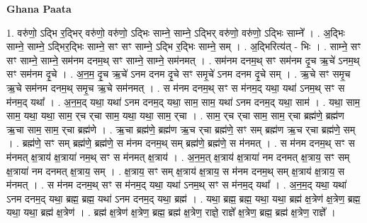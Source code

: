 \documentclass[17pt]{extarticle}
\begin{document}
\textbf{Ghana Paata } \newline

1. वरु॑णो॒ ऽद्भि र॒द्भिर् वरु॑णो॒ वरु॑णो॒ ऽद्भिः साम्ने॒ साम्ने॒ ऽद्भिर् वरु॑णो॒ वरु॑णो॒ ऽद्भिः साम्ने᳚ । . अ॒द्भिः साम्ने॒ साम्ने॒ ऽद्भिर॒द्भिः साम्ने॒ सꣳ सꣳ साम्ने॒ ऽद्भि र॒द्भिः साम्ने॒ सम् । . अ॒द्भिरित्य॑त् - भिः । . साम्ने॒ सꣳ सꣳ साम्ने॒ साम्ने॒ सम॑नम दनम॒थ् सꣳ साम्ने॒ साम्ने॒ सम॑नमत् । . सम॑नम दनम॒थ् सꣳ सम॑नम दृ॒च ऋ॒चे॑ ऽनम॒थ् सꣳ सम॑नम दृ॒चे । . अ॒न॒म॒ दृ॒च ऋ॒चे॑ ऽनम दनम दृ॒चे सꣳ समृ॒चे॑ ऽनम दनम दृ॒चे सम् । . ऋ॒चे सꣳ समृ॒च ऋ॒चे सम॑नम दनम॒थ् समृ॒च ऋ॒चे सम॑नमत् । . स म॑नम दनम॒थ् सꣳ स म॑नम॒द् यथा॒ यथा॑ ऽनम॒थ् सꣳ स म॑नम॒द् यथा᳚ । . अ॒न॒म॒द् यथा॒ यथा॑ ऽनम दनम॒द् यथा॒ साम॒ साम॒ यथा॑ ऽनम दनम॒द् यथा॒ साम॑ । . यथा॒ साम॒ साम॒ यथा॒ यथा॒ साम॒ र्‌च र्‌चा साम॒ यथा॒ यथा॒ साम॒ र्‌चा । . साम॒ र्‌च र्‌चा साम॒ साम॒ र्‌चा ब्रह्म॑णे॒ ब्रह्म॑ण ऋ॒चा साम॒ साम॒ र्‌चा ब्रह्म॑णे । . ऋ॒चा ब्रह्म॑णे॒ ब्रह्म॑ण ऋ॒च र्‌चा ब्रह्म॑णे॒ सꣳ सम् ब्रह्म॑ण ऋ॒च र्‌चा ब्रह्म॑णे॒ सम् । . ब्रह्म॑णे॒ सꣳ सम् ब्रह्म॑णे॒ ब्रह्म॑णे॒ स म॑नम दनम॒थ् सम् ब्रह्म॑णे॒ ब्रह्म॑णे॒ स म॑नमत् । . स म॑नम दनम॒थ् सꣳ स म॑नमत् क्ष॒त्राय॑ क्ष॒त्राया॑ नम॒थ् सꣳ स म॑नमत् क्ष॒त्राय॑ । . अ॒न॒म॒त् क्ष॒त्राय॑ क्ष॒त्राया॑ नम दनमत् क्ष॒त्राय॒ सꣳ सम् क्ष॒त्राया॑ नम दनमत् क्ष॒त्राय॒ सम् । . क्ष॒त्राय॒ सꣳ सम् क्ष॒त्राय॑ क्ष॒त्राय॒ स म॑नम दनम॒थ् सम् क्ष॒त्राय॑ क्ष॒त्राय॒ स म॑नमत् । . स म॑नम दनम॒थ् सꣳ स म॑नम॒द् यथा॒ यथा॑ ऽनम॒थ् सꣳ स म॑नम॒द् यथा᳚ । . अ॒न॒म॒द् यथा॒ यथा॑ ऽनम दनम॒द् यथा॒ ब्रह्म॒ ब्रह्म॒ यथा॑ ऽनम दनम॒द् यथा॒ ब्रह्म॑ । . यथा॒ ब्रह्म॒ ब्रह्म॒ यथा॒ यथा॒ ब्रह्म॑ क्ष॒त्रेण॑ क्ष॒त्रेण॒ ब्रह्म॒ यथा॒ यथा॒ ब्रह्म॑ क्ष॒त्रेण॑ । . ब्रह्म॑ क्ष॒त्रेण॑ क्ष॒त्रेण॒ ब्रह्म॒ ब्रह्म॑ क्ष॒त्रेण॒ राज्ञे॒ राज्ञे᳚ क्ष॒त्रेण॒ ब्रह्म॒ ब्रह्म॑ क्ष॒त्रेण॒ राज्ञे᳚ । \newline
\end{document}

